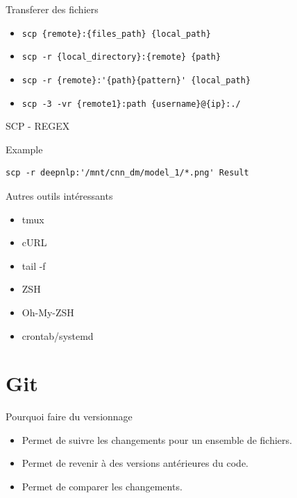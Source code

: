 \documentclass[11pt]{beamer}
\begin{document}
\begin{frame}[fragile]{Transferer des fichiers}
	\begin{itemize}[<+->]
		\item \verb|scp {remote}:{files_path} {local_path}|
		\item \verb|scp -r {local_directory}:{remote} {path}|
		\item \verb|scp -r {remote}:'{path}{pattern}' {local_path}| 
		\item \verb|scp -3 -vr {remote1}:path {username}@{ip}:./| 
	\end{itemize}
\end{frame}

\begin{frame}[fragile]{SCP - REGEX}
\begin{block}{Example}
\begin{lstlisting}
scp -r deepnlp:'/mnt/cnn_dm/model_1/*.png' Result
\end{lstlisting}
\end{block}
\end{frame}

\begin{frame}[fragile]{Autres outils intéressants}
	\begin{itemize}
		\item tmux
		\item cURL
		\item tail -f
		\item ZSH
		\item Oh-My-ZSH
		\item crontab/systemd
	\end{itemize}
\end{frame}


\section{Git}


\begin{frame}{Pourquoi faire du versionnage}
	\begin{itemize}[<+->]
		\item Permet de suivre les changements pour un ensemble de fichiers.
		\item Permet de revenir à des versions antérieures du code.
		\item Permet de comparer les changements.
	\end{itemize}
\end{frame}
\end{document}
